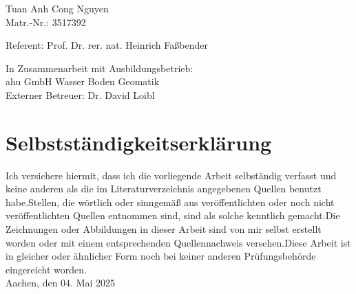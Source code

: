 \documentclass[a4paper,12pt]{scrreprt}
\newcommand{\dcplace}{Aachen}
\newcommand{\dcdate}{04. Mai 2025}
\begin{document}
\begin{titlepage}
	\vspace{1.5cm}
    
	\begin{minipage}[t]{9cm}
		\centering Tuan Anh Cong Nguyen \\ Matr.-Nr.: 3517392
	\end{minipage}
	\vspace{2.1cm}
    
	\centering \begin{minipage}[b]{15cm}
		\centering
			Referent: Prof. Dr. rer. nat. Heinrich Faßbender\\
	\end{minipage}

	\vspace{1.5cm}
	
	\centering %
	\begin{minipage}[b]{10cm}
			\centering
            In Zusammenarbeit mit Ausbildungsbetrieb:\\
            ahu GmbH Wasser Boden Geomatik \\
            \vspace{1cm}
            Externer Betreuer: Dr. David Loibl
			\vspace{1cm}
	\end{minipage}

	\restoregeometry
\end{titlepage}

\clearpage %
\chapter*{Selbstständigkeitserklärung}
\thispagestyle{empty}	%
Ich versichere hiermit, dass ich die vorliegende Arbeit selbständig verfasst und keine anderen als die im Literaturverzeichnis angegebenen Quellen benutzt habe.Stellen, die wörtlich oder sinngemäß aus veröffentlichten oder noch nicht veröffentlichten Quellen entnommen sind, sind als solche kenntlich gemacht.Die Zeichnungen oder Abbildungen in dieser Arbeit sind von mir selbst erstellt worden oder mit einem entsprechenden Quellennachweis versehen.Diese Arbeit ist in gleicher oder ähnlicher Form noch bei keiner anderen Prüfungsbehörde eingereicht worden.\\[2ex]
\dcplace , den \dcdate\\[6ex]
\flushleft
\tableofcontents
\end{document}
